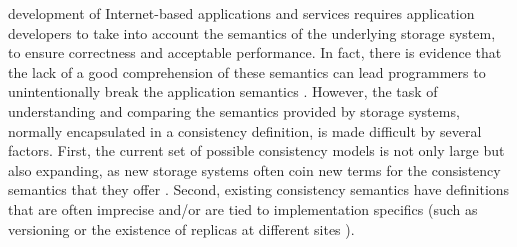 \documentclass[journal,compsoc]{IEEEtran}
\begin{document}

    development of Internet-based applications and services requires application developers to take into account the semantics of the
underlying storage system, to ensure correctness and acceptable performance.
 In fact, there is evidence that the lack of a good comprehension of these
semantics can lead programmers to unintentionally break the application semantics \cite{Bailis:2015:FCC:2723372.2737784}.
However, the task of understanding and comparing the semantics provided by storage systems, normally encapsulated in a consistency definition, is made difficult by several factors. First, the current set of possible consistency models is not only large but also expanding, as new storage systems often coin new terms for the consistency semantics that they offer \cite{Cooper:2008:PYH:1454159.1454167, Lloyd:2011:DSE:2043556.2043593, Lakshman:2010:CDS:1773912.1773922}.
Second, existing consistency semantics have definitions that are often imprecise and/or are tied to implementation specifics (such as versioning \cite{DBLP:conf/icde/AdyaLO00} or the existence of replicas at different sites \cite{Li:2012:MGS:2387880.2387906}).
\end{document}
